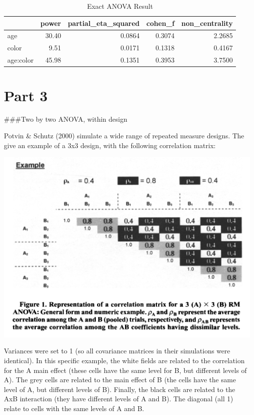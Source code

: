 \documentclass[]{book}
\begin{document}
\begin{table}[t]

\caption{\label{tab:unnamed-chunk-122}Exact ANOVA Result}
\centering
\begin{tabular}{l|r|r|r|r}
\hline
  & power & partial\_eta\_squared & cohen\_f & non\_centrality\\
\hline
age & 30.40 & 0.0864 & 0.3074 & 2.2685\\
\hline
color & 9.51 & 0.0171 & 0.1318 & 0.4167\\
\hline
age:color & 45.98 & 0.1351 & 0.3953 & 3.7500\\
\hline
\end{tabular}
\end{table}

\hypertarget{part-3-2}{%
\section{Part 3}\label{part-3-2}}

\#\#\#Two by two ANOVA, within design

Potvin \& Schutz (2000) simulate a wide range of repeated measure designs. The give an example of a 3x3 design, with the following correlation matrix:

\includegraphics{screenshots/PS2000.png}

Variances were set to 1 (so all covariance matrices in their simulations were identical). In this specific example, the white fields are related to the correlation for the A main effect (these cells have the same level for B, but different levels of A). The grey cells are related to the main effect of B (the cells have the same level of A, but different levels of B). Finally, the black cells are related to the AxB interaction (they have different levels of A and B). The diagonal (all 1) relate to cells with the same levels of A and B.
\end{document}
